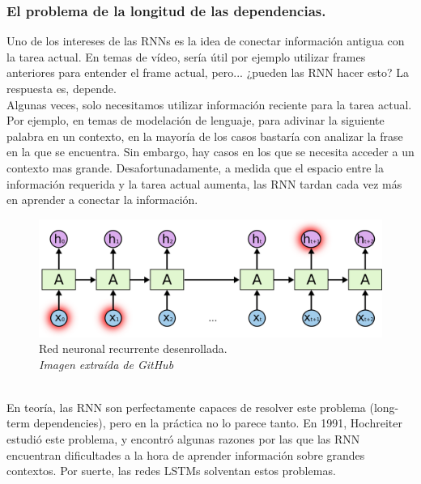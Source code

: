\subsubsection{El problema de la longitud de las dependencias.}
Uno de los intereses de las RNNs es la idea de conectar información antigua con la tarea actual. En temas de vídeo, sería útil por ejemplo utilizar frames anteriores para entender el frame actual, pero... ¿pueden las RNN hacer esto? La respuesta es, depende.\\
Algunas veces, solo necesitamos utilizar información reciente para la tarea actual. Por ejemplo, en temas de modelación de lenguaje, para adivinar la siguiente palabra en un contexto, en la mayoría de los casos bastaría con analizar la frase en la que se encuentra. Sin embargo, hay casos en los que se necesita acceder a un contexto mas grande. Desafortunadamente, a medida que el espacio entre la información requerida y la tarea actual aumenta, las RNN tardan cada vez más en aprender a conectar la información.\\
\begin{figure}[htp]
\centering
\includegraphics[scale=0.3]{images/RNN-longtermdependencies.png}
\caption{Red neuronal recurrente desenrollada.\\\textit{Imagen extraída de GitHub}}
\end{figure}
\\En teoría, las RNN son perfectamente capaces de resolver este problema (long-term dependencies), pero en la práctica no lo parece tanto. En 1991, Hochreiter estudió este problema, y encontró algunas razones por las que las RNN encuentran dificultades a la hora de aprender información sobre grandes contextos. Por suerte, las redes LSTMs solventan estos problemas.
